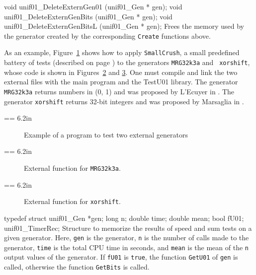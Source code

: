 void unif01_DeleteExternGen01 (unif01_Gen * gen);
void unif01_DeleteExternGenBits (unif01_Gen * gen);
void unif01_DeleteExternGenBitsL (unif01_Gen * gen);
\endcode
 \tab  Frees the memory used by the generator created by the corresponding
 {\tt Create} functions above.
 \endtab


\bigskip
As an example, Figure~\ref{prog:ex7}  shows how to apply
 {\tt SmallCrush}, a small predefined battery of tests (described on page
 \pageref{bat:SmallCrush}) to the generators {\tt MRG32k3a} and {\tt
xorshift}, whose code is shown in Figures~\ref{fig:MRG32k3a} and
 \ref{fig:xorshift}.  One must compile and link the two external
files with the main program and the TestU01 library.
The generator {\tt MRG32k3a} returns numbers in (0, 1) and was
proposed by L'Ecuyer in \cite{rLEC99b}.
The generator {\tt xorshift} returns 32-bit integers
and was proposed by Marsaglia in \cite[page 4]{rMAR03a}.



=\vbox {\hsize = 6.2in
{\smallc
}
}

\begin{figure} \centering {}
\caption {Example of a program to test two external generators}
\label {prog:ex7}
\end{figure}


=\vbox {\hsize = 6.2in
{\smallc
}
}

\begin{figure} \centering {}
\caption {External function for {\tt MRG32k3a}.}
\label {fig:MRG32k3a}
\end{figure}


=\vbox {\hsize = 6.2in
{\smallc
}
}

\begin{figure} \centering {}
\caption {External function for {\tt xorshift}.}
\label {fig:xorshift}
\end{figure}



\code

typedef struct {
   unif01_Gen *gen;
   long n;
   double time;
   double mean;
   bool fU01;
   } unif01_TimerRec;
\endcode
 \tab  Structure to memorize the results of speed and sum tests on a given
   generator. Here, {\tt gen} is the generator,
   {\tt n} is the number of calls made to the generator,
   {\tt time} is the total CPU time in seconds, and
   {\tt mean} is the mean of the {\tt n} output values of the generator.
   If {\tt fU01} is  {\tt true}, the function {\tt GetU01} of
   {\tt gen} is called, otherwise the function  {\tt GetBits} is called.
 \endtab
\code


